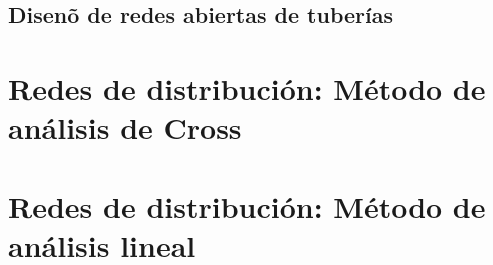 \documentclass[11pt, oneside]{article}
\begin{document}
\subsection{Disen\~o de  redes abiertas de tuber\'ias}


\section{Redes de distribuci\'on: M\'etodo de an\'alisis de Cross}

\section{Redes de distribuci\'on: M\'etodo de an\'alisis lineal}




\end{document}
